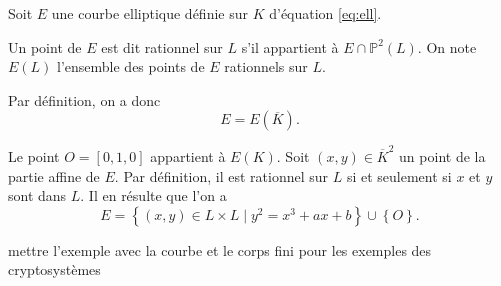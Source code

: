 Soit $E$ une courbe elliptique définie sur $K$ d'équation \eqref{eq:ell}.

\begin{definition}
    Un point de $E$ est dit rationnel sur $L$ s'il appartient à $E \cap \mathbb{P}^2(L)$. On note $E(L)$ l'ensemble des points de $E$ rationnels sur $L$.

    Par définition, on a donc
    \[
    E = E(\overline{K})
    .\] 
\end{definition}

Le point $O = [0,1,0]$ appartient à $E(K)$. Soit $(x,y) \in \overline{K}^2$ un point de la partie affine de $E$. Par définition, il est rationnel sur $L$ si et seulement si $x$ et $y$ sont dans $L$. Il en résulte que l'on a 
\[
E = \left\{ (x,y) \in L \times L \mid y^2 = x^3+ax+b \right\} \cup \left\{ O \right\} 
.\] 

\begin{exemple}
    mettre l'exemple avec la courbe et le corps fini pour les exemples des cryptosystèmes
\end{exemple}
